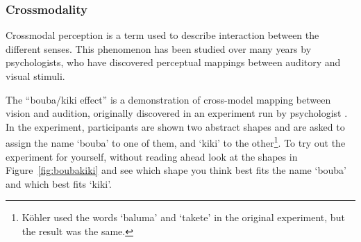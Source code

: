 

\subsubsection{Crossmodality}
Crossmodal perception is a term used to describe interaction between the different senses. This phenomenon has been
studied over many years by psychologists, who have discovered perceptual mappings between auditory and visual stimuli.

The ``bouba/kiki effect'' is a demonstration of cross-model mapping between vision and audition, originally discovered
in an experiment run by psychologist \citet{Koehler1929}. In the experiment, participants are shown two abstract shapes
and are asked to assign the name `bouba' to one of them, and `kiki' to the other\footnote{K\"ohler used the words
  `baluma' and `takete' in the original experiment, but the result was the same.}. To try out the experiment for
yourself, without reading ahead look at the shapes in Figure~\ref{fig:boubakiki} and see which shape you think best
fits the name `bouba' and which best fits `kiki'.

